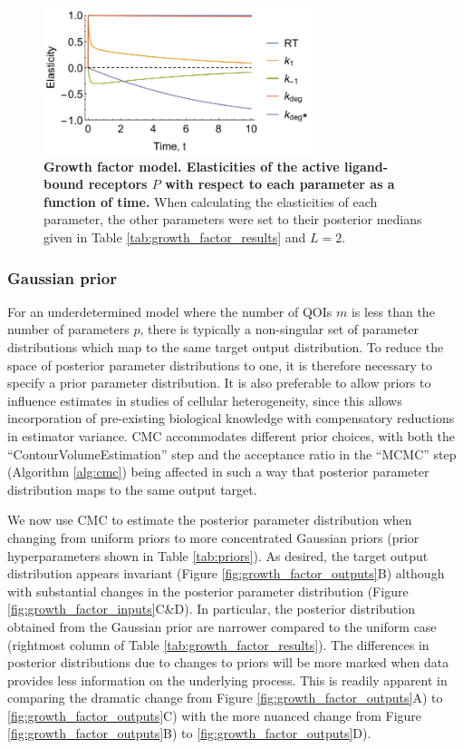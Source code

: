 \begin{figure}[H]
	\centerline{\includegraphics[width=0.7\textwidth]{../figures/dixit_elasticities.pdf}}
	\caption{\textbf{Growth factor model. Elasticities of the active ligand-bound receptors $P$ with respect to each parameter as a function of time.} When calculating the elasticities of each parameter, the other parameters were set to their posterior medians given in Table \ref{tab:growth_factor_results} and $L=2$.}
	\label{fig:dixit_elasticities}
\end{figure}

\subsubsection{Gaussian prior}
For an underdetermined model where the number of QOIs $m$ is less than the number of parameters $p$, there is typically a non-singular set of parameter distributions which map to the same target output distribution. To reduce the space of posterior parameter distributions to one, it is therefore necessary to specify a prior parameter distribution. It is also preferable to allow priors to influence estimates in studies of cellular heterogeneity, since this allows incorporation of pre-existing biological knowledge with compensatory reductions in estimator variance. CMC accommodates different prior choices, with both the ``ContourVolumeEstimation'' step and the acceptance ratio in the ``MCMC'' step (Algorithm \ref{alg:cmc}) being affected in such a way that posterior parameter distribution maps to the same output target.

We now use CMC to estimate the posterior parameter distribution when changing from uniform priors to more concentrated Gaussian priors (prior hyperparameters shown in Table \ref{tab:priors}). As desired, the target output distribution appears invariant (Figure \ref{fig:growth_factor_outputs}B) although with substantial changes in the posterior parameter distribution (Figure \ref{fig:growth_factor_inputs}C\&D). In particular, the posterior distribution obtained from the Gaussian prior are narrower compared to the uniform case (rightmost column of Table \ref{tab:growth_factor_results}). The differences in posterior distributions due to changes to priors will be more marked when data provides less information on the underlying process. This is readily apparent in comparing the dramatic change from Figure \ref{fig:growth_factor_outputs}A) to \ref{fig:growth_factor_outputs}C) with the more nuanced change from Figure \ref{fig:growth_factor_outputs}B) to \ref{fig:growth_factor_outputs}D).

